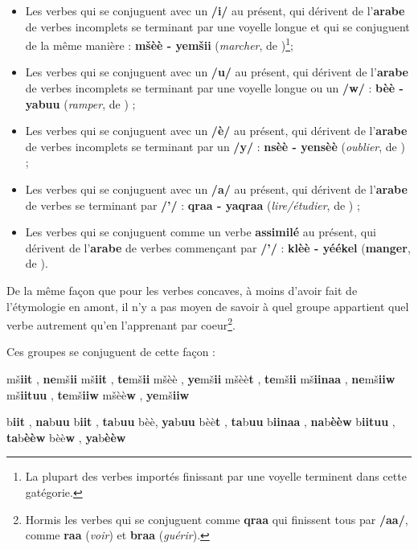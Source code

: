 \begin{itemize}
    \item Les verbes qui se conjuguent avec un \textbf{/i/} au présent, qui dérivent de l'\textbf{arabe} de verbes incomplets se terminant par une voyelle longue et qui se conjuguent de la même manière : \textbf{m\v{s}èè - yem\v{s}ii} (\textit{marcher}, de )\footnote{La plupart des verbes importés finissant par une voyelle terminent dans cette gatégorie.};
    \item Les verbes qui se conjuguent avec un \textbf{/u/} au présent, qui dérivent de l'\textbf{arabe} de verbes incomplets se terminant par une voyelle longue ou un \textbf{/w/} : \textbf{\textcrh bèè - ya\textcrh buu} (\textit{ramper}, de ) ;
    \item Les verbes qui se conjuguent avec un \textbf{/è/} au présent, qui dérivent de l'\textbf{arabe} de verbes incomplets se terminant par un \textbf{/y/} : \textbf{nsèè - yensèè} (\textit{oublier}, de ) ;
    \item Les verbes qui se conjuguent avec un \textbf{/a/} au présent, qui dérivent de l'\textbf{arabe} de verbes se terminant par \textbf{/'/} : \textbf{qraa - yaqraa} (\textit{lire/étudier},  de ) ; 
    \item Les verbes qui se conjuguent comme un verbe \textbf{assimilé} au présent, qui dérivent de l'\textbf{arabe} de verbes commençant par \textbf{/'/} : \textbf{klèè - yéékel} (\textbf{manger}, de ).
\end{itemize}

De la même façon que pour les verbes concaves, à moins d'avoir fait de l'étymologie en amont, il n'y a pas moyen de savoir à quel groupe appartient quel verbe autrement qu'en l'apprenant par coeur\footnote{Hormis les verbes qui se conjuguent comme \textbf{qraa} qui finissent tous par \textbf{/aa/}, comme \textbf{raa} (\textit{voir}) et \textbf{braa} (\textit{guérir}).}. 

Ces groupes se conjuguent de cette façon :

    {m\v{s}\textbf{iit} , \textbf{ne}m\v{s}\textbf{ii}}
    {m\v{s}\textbf{iit} , \textbf{te}m\v{s}\textbf{ii}}
    {m\v{s}èè , \textbf{ye}m\v{s}\textbf{ii}}
    {m\v{s}èè\textbf{t} , \textbf{te}m\v{s}\textbf{ii}}
    {m\v{s}\textbf{iinaa} , \textbf{ne}m\v{s}\textbf{iiw}}
    {m\v{s}\textbf{iituu} , \textbf{te}m\v{s}\textbf{iiw}}
    {m\v{s}èè\textbf{w} , \textbf{ye}m\v{s}\textbf{iiw}}

    {\textcrh b\textbf{iit} , \textbf{na}\textcrh b\textbf{uu}}
    {\textcrh b\textbf{iit} , \textbf{ta}\textcrh b\textbf{uu}}
    {\textcrh bèè, \textbf{ya}\textcrh b\textbf{uu}}
    {\textcrh bèè\textbf{t} , \textbf{ta}\textcrh b\textbf{uu}}
    {\textcrh b\textbf{iinaa} , \textbf{na}\textcrh b\textbf{èèw}}
    {\textcrh b\textbf{iituu} , \textbf{ta}\textcrh b\textbf{èèw}}
    {\textcrh bèè\textbf{w} , \textbf{ya}\textcrh b\textbf{èèw}}
    
